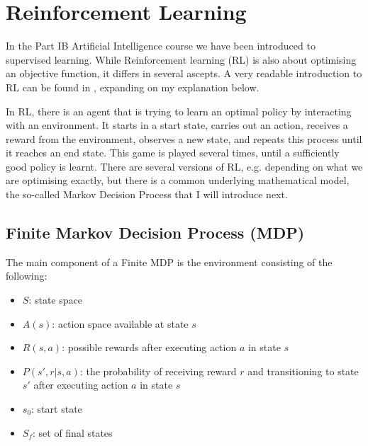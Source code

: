 
\section{Reinforcement Learning}


In the Part IB Artificial Intelligence course we have been introduced to supervised learning. While Reinforcement learning (RL) is also about optimising an objective function, it differs in several ascepts. A very readable introduction to RL can be found in \cite{sutton2018RLbook}, expanding on my explanation below.


In RL, there is an agent that is trying to learn an optimal policy by interacting with an environment. It starts in a start state, carries out an action, receives a reward from the environment, observes a new state, and repeats this process until it reaches an end state. This game is played several times, until a sufficiently good policy is learnt. There are several versions of RL, e.g. depending on what we are optimising exactly, but there is a common underlying mathematical model, the so-called Markov Decision Process that I will introduce next.

\subsection{Finite Markov Decision Process (MDP)}


The main component of a Finite MDP is the environment consisting of the following:

\begin{itemize}
    \item 
    $S$: state space
    \item
    $A(s)$: action space available at state $s$
    \item
    $R(s, a)$: possible rewards after executing action $a$ in state $s$
    \item
    $P(s', r | s, a)$: the probability of receiving reward $r$ and transitioning to state $s'$ after executing action $a$ in state $s$
    \item
    $s_0$: start state
    \item
    $S_f$: set of final states
\end{itemize} 


